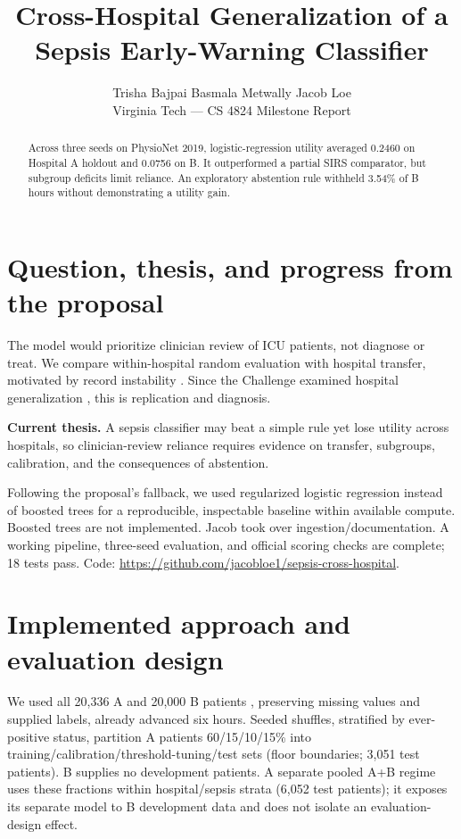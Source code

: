 \documentclass{article}
\title{Cross-Hospital Generalization of a Sepsis Early-Warning Classifier}
\author{Trisha Bajpai \qquad Basmala Metwally \qquad Jacob Loe\\Virginia Tech --- CS 4824 Milestone Report}
\date{}
\begin{document}
\maketitle
\begin{abstract}
Across three seeds on PhysioNet 2019, logistic-regression utility averaged 0.2460 on Hospital A holdout and 0.0756 on B. It outperformed a partial SIRS comparator, but subgroup deficits limit reliance. An exploratory abstention rule withheld 3.54\% of B hours without demonstrating a utility gain.
\end{abstract}

\section{Question, thesis, and progress from the proposal}
The model would prioritize clinician review of ICU patients, not diagnose or treat. We compare within-hospital random evaluation with hospital transfer, motivated by record instability \citep{nestor2019}. Since the Challenge examined hospital generalization \citep{reyna2020}, this is replication and diagnosis.

\textbf{Current thesis.} A sepsis classifier may beat a simple rule yet lose utility across hospitals, so clinician-review reliance requires evidence on transfer, subgroups, calibration, and the consequences of abstention.

Following the proposal's fallback, we used regularized logistic regression instead of boosted trees for a reproducible, inspectable baseline within available compute. Boosted trees are not implemented. Jacob took over ingestion/documentation. A working pipeline, three-seed evaluation, and official scoring checks are complete; 18 tests pass. Code: \url{https://github.com/jacobloe1/sepsis-cross-hospital}.

\section{Implemented approach and evaluation design}
We used all 20,336 A and 20,000 B patients \citep{data2019}, preserving missing values and supplied labels, already advanced six hours. Seeded shuffles, stratified by ever-positive status, partition A patients 60/15/10/15\% into training/calibration/threshold-tuning/test sets (floor boundaries; 3,051 test patients). B supplies no development patients. A separate pooled A+B regime uses these fractions within hospital/sepsis strata (6,052 test patients); it exposes its separate model to B development data and does not isolate an evaluation-design effect.
\end{document}
